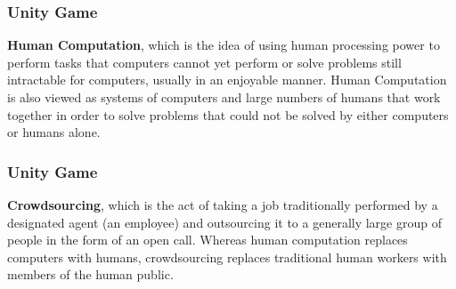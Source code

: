 \documentclass{beamer}
\begin{document}
\begin{frame}
\frametitle{Unity Game}
\textbf{Human Computation}, which is the idea of using human processing power to perform tasks that computers cannot yet perform or solve problems still intractable for computers, usually in an enjoyable manner. Human Computation is also viewed as systems of computers and large numbers of humans that work together in order to solve problems that could not be solved by either computers or humans alone.
\end{frame}
\begin{frame}
\frametitle{Unity Game}
\textbf{Crowdsourcing}, which is the act of taking a job traditionally performed by a designated agent (an employee) and outsourcing it to a generally large group of people in the form of an open call. Whereas human computation replaces computers with humans, crowdsourcing replaces traditional human workers with members of the human public.
\end{frame}
\end{document}

